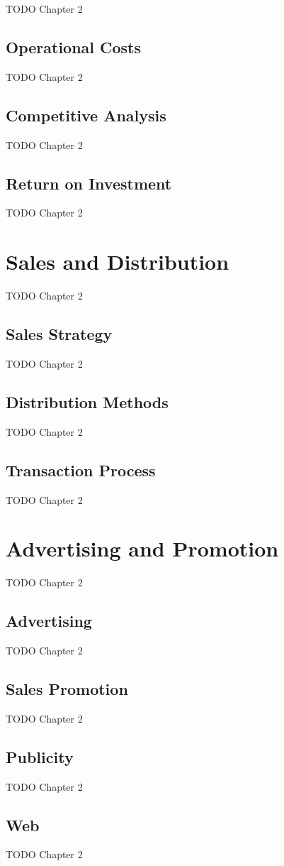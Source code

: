 TODO Chapter 2

\subsection{Operational Costs}

TODO Chapter 2

\subsection{Competitive Analysis}

TODO Chapter 2

\subsection{Return on Investment}

TODO Chapter 2


\section{Sales and Distribution}

TODO Chapter 2

\subsection{Sales Strategy}

TODO Chapter 2

\subsection{Distribution Methods}

TODO Chapter 2

\subsection{Transaction Process}

TODO Chapter 2


\section{Advertising and Promotion}

TODO Chapter 2

\subsection{Advertising}

TODO Chapter 2

\subsection{Sales Promotion}

TODO Chapter 2

\subsection{Publicity}

TODO Chapter 2

\subsection{Web}

TODO Chapter 2
